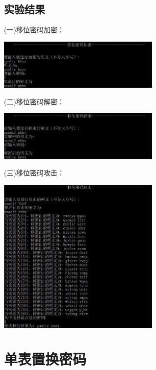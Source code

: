 \documentclass[UTF8,a4paper]{article}
\begin{document}
	\subsection{实验结果}
	(一)移位密码加密：\par 

\begin{center}		\includegraphics[width=0.6\textwidth]{firstEncry.JPG}
\end{center}

		(二)移位密码解密：\par 
\begin{center}
		\includegraphics[width=0.6\textwidth]{firstDecry.JPG}
\end{center}

	(三)移位密码攻击：\par 

\begin{center}	
	\includegraphics[width=0.6\textwidth]{firstAttack.JPG}
\end{center}

\section{单表置换密码}
\end{document}
